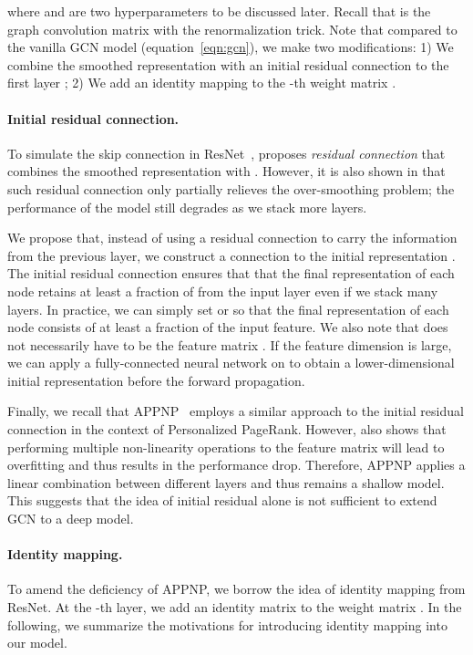 \documentclass{article}
\begin{document}
where  and  are two hyperparameters to be
discussed later.
Recall that   is the graph
convolution matrix with the renormalization trick.
Note that compared to the vanilla GCN model (equation~\eqref{eqn:gcn}), we make two
modifications: 1) We combine the smoothed representation  with an initial residual connection to the
first layer ; 2) We add an identity
  mapping   to the -th weight matrix
. 

\paragraph{Initial residual connection.}
To simulate the skip connection in
ResNet~\cite{DBLP:conf/cvpr/HeZRS16}, 
\cite{DBLP:conf/iclr/KipfW17} proposes {\em residual connection} that combines  the
smoothed representation  with . However,  it is also
shown in \cite{DBLP:conf/iclr/KipfW17} that such residual connection only partially relieves the
over-smoothing problem; the performance of the model still degrades as
we stack more layers.

We propose that, instead of using a residual
connection to carry the information from the previous layer, we
construct a connection to the initial representation
. The initial residual connection ensures that that the final
representation of each node retains at least a fraction of
 from the input
layer even if we stack many
layers.  In practice, we can simply set  or  so that the final representation of each node consists
of at least a fraction of the input feature. 
We also note that   does not necessarily have to be the
feature matrix .  If the feature dimension  is large,
we can apply a fully-connected neural network on  to obtain a lower-dimensional
initial representation  before the forward
propagation.


Finally, we recall that APPNP~\cite{klicpera_predict_2019} 
employs a similar approach to the initial residual connection  in the context of Personalized
PageRank. However,  \cite{klicpera_predict_2019}  also shows that performing multiple
non-linearity operations to the feature matrix will lead to
overfitting and thus results in
the performance drop.  Therefore,
APPNP applies a linear combination between different layers and thus remains a shallow
model. This suggests that the idea of initial
residual alone is not sufficient to
extend GCN to a deep model. 

\paragraph{Identity mapping.} To amend the deficiency of APPNP, we
borrow the idea of identity mapping from ResNet.
At the -th layer, we add an identity matrix  to the
weight matrix . In the following, we summarize the motivations for
introducing 
identity mapping into our model.
\end{document}
